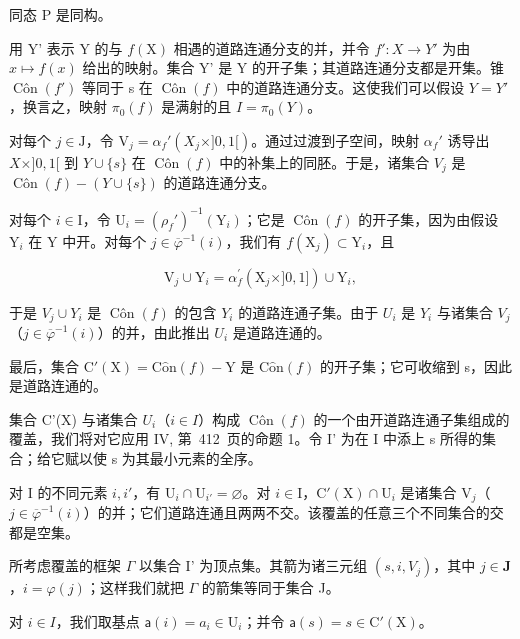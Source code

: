 同态 P 是同构。

用 Y' 表示 Y 的与 \(f(\mathrm{X})\) 相遇的道路连通分支的并，并令 \(f'\colon X \to Y'\) 为由 \(x \mapsto f(x)\) 给出的映射。集合 Y' 是 Y 的开子集；其道路连通分支都是开集。锥 \(\operatorname{Côn}(f')\) 等同于 s 在 \(\operatorname{Côn}(f)\) 中的道路连通分支。这使我们可以假设 \(Y = Y'\)，换言之，映射 \(\pi_{0}(f)\) 是满射的且 \(I = \pi_{0}(Y)\)。

对每个 \(j \in \mathrm{J}\)，令 \(\mathrm{V}_j = \alpha_f'(X_j \times ]0,1[)\)。通过过渡到子空间，映射 \(\alpha_f'\) 诱导出 \(X \times ]0,1[\) 到 \(Y \cup \{s\}\) 在 \(\operatorname{Côn}(f)\) 中的补集上的同胚。于是，诸集合 \(V_j\) 是 \(\operatorname{Côn}(f) - (Y \cup \{s\})\) 的道路连通分支。

对每个 \(i \in \mathrm{I}\)，令 \(\mathrm{U}_i = (\rho_f')^{-1}(\mathrm{Y}_i)\)；它是 \(\operatorname{Côn}(f)\) 的开子集，因为由假设 \(\mathrm{Y}_i\) 在 \(\mathrm{Y}\) 中开。对每个 \(j \in \overline{\varphi}^{-1}(i)\)，我们有 \(f(\mathrm{X}_j) \subset \mathrm{Y}_i\)，且

\[
\mathrm{V} _ {j} \cup \mathrm{Y} _ {i} = \alpha_ {f} ^ {\prime} (\mathrm{X} _ {j} \times ] 0, 1 ]) \cup \mathrm{Y} _ {i},
\]

于是 \(V_{j} \cup Y_{i}\) 是 \(\operatorname{Côn}(f)\) 的包含 \(Y_{i}\) 的道路连通子集。由于 \(U_{i}\) 是 \(Y_{i}\) 与诸集合 \(V_{j}\)（\(j \in \overline{\varphi}^{-1}(i)\)）的并，由此推出 \(U_{i}\) 是道路连通的。

最后，集合 \(\mathrm{C}'(\mathrm{X}) = \mathrm{C}\hat{\mathrm{o}}\mathrm{n}(f) - \mathrm{Y}\) 是 \(\mathrm{C}\hat{\mathrm{o}}\mathrm{n}(f)\) 的开子集；它可收缩到 s，因此是道路连通的。

集合 C'(X) 与诸集合 \(U_{i}\)（\(i \in I\)）构成 \(\operatorname{Côn}(f)\) 的一个由开道路连通子集组成的覆盖，我们将对它应用 IV, 第~412~页的命题 1。令 I' 为在 I 中添上 s 所得的集合；给它赋以使 s 为其最小元素的全序。

对 I 的不同元素 \(i, i'\)，有 \(\mathrm{U}_{i} \cap \mathrm{U}_{i'} = \varnothing\)。对 \(i \in \mathrm{I}\)，\(\mathrm{C}'(\mathrm{X}) \cap \mathrm{U}_{i}\) 是诸集合 \(\mathrm{V}_{j}\)（\(j \in \overline{\varphi}^{-1}(i)\)）的并；它们道路连通且两两不交。该覆盖的任意三个不同集合的交都是空集。

所考虑覆盖的框架 \(\Gamma\) 以集合 I' 为顶点集。其箭为诸三元组 \((s, i, V_j)\)，其中 \(j \in \mathbf{J}\)，\(i = \varphi(j)\)；这样我们就把 \(\Gamma\) 的箭集等同于集合 J。

对 \(i \in I\)，我们取基点 \(\mathsf{a}(i) = a_i \in \mathrm{U}_i\)；并令 \(\mathsf{a}(s) = s \in \mathrm{C}'(\mathrm{X})\)。

